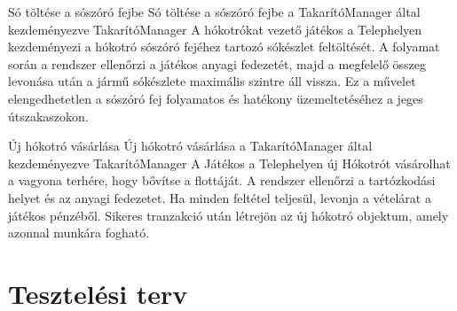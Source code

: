 \begin{use-case}
    {Só töltése a sószóró fejbe}
    {Só töltése a sószóró fejbe a TakarítóManager által kezdeményezve}
    {TakarítóManager}
    A hókotrókat vezető játékos a Telephelyen kezdeményezi a hókotró sószóró fejéhez tartozó sókészlet feltöltését. A folyamat során a rendszer ellenőrzi a játékos anyagi fedezetét, majd a megfelelő összeg levonása után a jármű sókészlete maximális szintre áll vissza. Ez a művelet elengedhetetlen a sószóró fej folyamatos és hatékony üzemeltetéséhez a jeges útszakaszokon.
\end{use-case}

\begin{use-case}
    {Új hókotró vásárlása}
    {Új hókotró vásárlása a TakarítóManager által kezdeményezve}
    {TakarítóManager}
    A Játékos a Telephelyen új Hókotrót vásárolhat a vagyona terhére, hogy bővítse a flottáját. A rendszer ellenőrzi a tartózkodási helyet és az anyagi fedezetet. Ha minden feltétel teljesül, levonja a vételárat a játékos pénzéből. Sikeres tranzakció után létrejön az új hókotró objektum, amely azonnal munkára fogható.
\end{use-case}

\section{Tesztelési terv}



